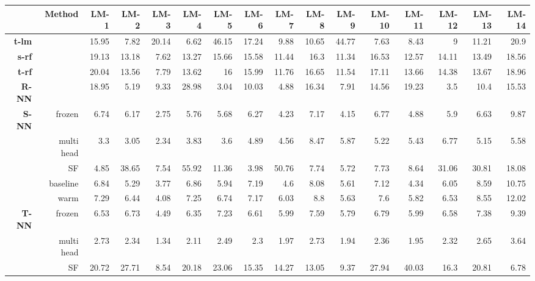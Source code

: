 \begin{table}
\begin{flushleft}
\begin{tabular}{rrrrrrrrrrrrrrrr}
 {} & {\textbf{Method}} & {\textbf{LM-1}} & {\textbf{LM-2}} & {\textbf{LM-3}} & {\textbf{LM-4}} & {\textbf{LM-5}} & {\textbf{LM-6}} & {\textbf{LM-7}} & {\textbf{LM-8}} & {\textbf{LM-9}} & {\textbf{LM-10}} & {\textbf{LM-11}} & {\textbf{LM-12}} & {\textbf{LM-13}} & {\textbf{LM-14}} \\ 
  \hline
{\textbf{t-lm}} &  & 15.95 & 7.82 & 20.14 & 6.62 & 46.15 & 17.24 & 9.88 & 10.65 & 44.77 & 7.63 & 8.43 & 9 & 11.21 & 20.9 \\ 
   \hline
{\textbf{s-rf}} &  & 19.13 & 13.18 & 7.62 & 13.27 & 15.66 & 15.58 & 11.44 & 16.3 & 11.34 & 16.53 & 12.57 & 14.11 & 13.49 & 18.56 \\ 
   \hline
{\textbf{t-rf}} &  & 20.04 & 13.56 & 7.79 & 13.62 & 16 & 15.99 & 11.76 & 16.65 & 11.54 & 17.11 & 13.66 & 14.38 & 13.67 & 18.96 \\ 
   \hline
{\textbf{R-NN}} &  & 18.95 & 5.19 & 9.33 & 28.98 & 3.04 & 10.03 & 4.88 & 16.34 & 7.91 & 14.56 & 19.23 & 3.5 & 10.4 & 15.53 \\ 
   \hline
{\textbf{S-NN}} & frozen & 6.74 & 6.17 & 2.75 & 5.76 & 5.68 & 6.27 & 4.23 & 7.17 & 4.15 & 6.77 & 4.88 & 5.9 & 6.63 & 9.87 \\ 
   & multi head & 3.3 & 3.05 & 2.34 & 3.83 & 3.6 & 4.89 & 4.56 & 8.47 & 5.87 & 5.22 & 5.43 & 6.77 & 5.15 & 5.58 \\ 
   & SF & 4.85 & 38.65 & 7.54 & 55.92 & 11.36 & 3.98 & 50.76 & 7.74 & 5.72 & 7.73 & 8.64 & 31.06 & 30.81 & 18.08 \\ 
   & baseline & 6.84 & 5.29 & 3.77 & 6.86 & 5.94 & 7.19 & 4.6 & 8.08 & 5.61 & 7.12 & 4.34 & 6.05 & 8.59 & 10.75 \\ 
   & warm & 7.29 & 6.44 & 4.08 & 7.25 & 6.74 & 7.17 & 6.03 & 8.8 & 5.63 & 7.6 & 5.82 & 6.53 & 8.55 & 12.02 \\ 
   \hline
{\textbf{T-NN}} & frozen & 6.53 & 6.73 & 4.49 & 6.35 & 7.23 & 6.61 & 5.99 & 7.59 & 5.79 & 6.79 & 5.99 & 6.58 & 7.38 & 9.39 \\ 
   & multi head & 2.73 & 2.34 & 1.34 & 2.11 & 2.49 & 2.3 & 1.97 & 2.73 & 1.94 & 2.36 & 1.95 & 2.32 & 2.65 & 3.64 \\ 
   & SF & 20.72 & 27.71 & 8.54 & 20.18 & 23.06 & 15.35 & 14.27 & 13.05 & 9.37 & 27.94 & 40.03 & 16.3 & 20.81 & 6.78 \\ 

\end{tabular}
\end{flushleft}
\end{table}
